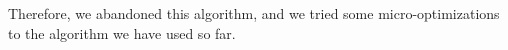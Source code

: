 \documentclass{article}
\begin{document}
Therefore, we abandoned this algorithm, and we tried some micro-optimizations to the algorithm we
have used so far.
%
%
%
%

\end{document}
